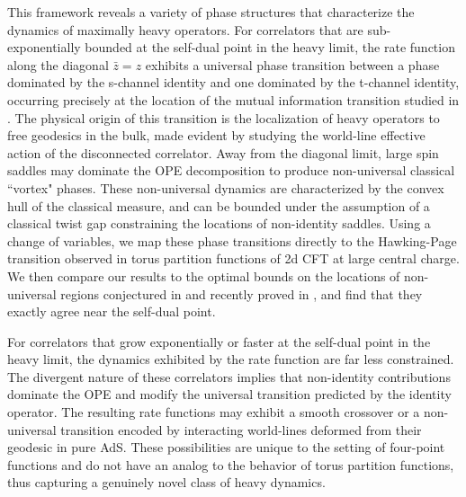 \documentclass[a4paper,11pt]{article}
\theoremstyle{plain}
\theoremstyle{definition}
\theoremstyle{remark}
\begin{document}
This framework reveals a variety of phase structures that characterize the dynamics of maximally heavy operators. For correlators that are sub-exponentially bounded at the self-dual point in the heavy limit, the rate function along the diagonal $\bar{z} = z$ exhibits a universal phase transition between a phase dominated by the s-channel identity and one dominated by the t-channel identity, occurring precisely at the location of the mutual information transition studied in \cite{Ceyhan:2025qrj}. The physical origin of this transition is the localization of heavy operators to free geodesics in the bulk, made evident by studying the world-line effective action of the disconnected correlator. Away from the diagonal limit, large spin saddles may dominate the OPE decomposition to produce non-universal classical ``vortex" phases. These non-universal dynamics are characterized by the convex hull of the classical measure, and can be bounded under the assumption of a classical twist gap constraining the locations of non-identity saddles. Using a change of variables, we map these phase transitions directly to the Hawking-Page transition observed in torus partition functions of 2d CFT at large central charge. We then compare our results to the optimal bounds on the locations of non-universal regions conjectured in \cite{Hartman:2014oaa} and recently proved in \cite{Dey:2024nje}, and find that they exactly agree near the self-dual point.

For correlators that grow exponentially or faster at the self-dual point in the heavy limit, the dynamics exhibited by the rate function are far less constrained. The divergent nature of these correlators implies that non-identity contributions dominate the OPE and modify the universal transition predicted by the identity operator. The resulting rate functions may exhibit a smooth crossover or a non-universal transition encoded by interacting world-lines deformed from their geodesic in pure AdS. These possibilities are unique to the setting of four-point functions and do not have an analog to the behavior of torus partition functions, thus capturing a genuinely novel class of heavy dynamics.
\end{document}
